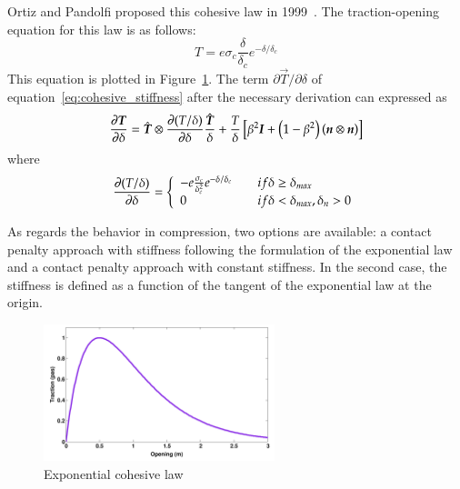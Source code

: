 Ortiz and Pandolfi proposed this cohesive law in 1999~\cite{ortiz1999}.  The
traction-opening equation for this law is as follows:
\begin{equation}
  \label{eq:exponential_law}
  T = e \sigma_c \frac{\delta}{\delta_c}e^{-\delta/ \delta_c}
\end{equation}
This equation is plotted in Figure~\ref{fig:smm:CL:ECL}. The term
$\partial{\vec{T}}/ \partial{\delta}$ of
equation~\eqref{eq:cohesive_stiffness} after the necessary derivation
can expressed as
\begin{equation}
  \label{eq:tangent_cohesive}
  \frac{\partial{\ensuremath{\boldsymbol{T}}}} {\partial{\delta}} = \hat{\boldsymbol{T}} \otimes
  \frac                       {\partial{(T/\delta)}}{\partial{\delta}}
  \frac{\hat{\boldsymbol{T}}}{\delta}+ \frac{T}{\delta}  \left[ \beta^2 \boldsymbol{I} +
  \left(1-\beta^2\right) \left(\boldsymbol{n} \otimes \boldsymbol{n}\right)\right]
\end{equation}
where
\begin{equation}
  \frac{\partial{(T/ \delta)}}{\partial{\delta}} = \left\{\begin{array} {l l}
      -e  \frac{\sigma_c}{\delta_c^2  }e^{-\delta  /  \delta_c} &  \quad  if
      \delta \geq \delta_{max}\\
      0 & \quad if \delta < \delta_{max}, \delta_n > 0
    \end{array} \right.
\end{equation}

As regards the behavior in compression, two options are available:
a contact penalty approach with stiffness following the formulation of
the exponential law and a contact penalty approach with constant
stiffness. In the second case, the stiffness is defined as a function
of the tangent of the exponential law at the origin.

\begin{figure}[!htb]
  \begin{center}
    \includegraphics[width=0.6\textwidth,keepaspectratio=true]{figures/cohesive_exponential.pdf}
    \caption{Exponential cohesive law}
    \label{fig:smm:CL:ECL}
  \end{center}
\end{figure}


